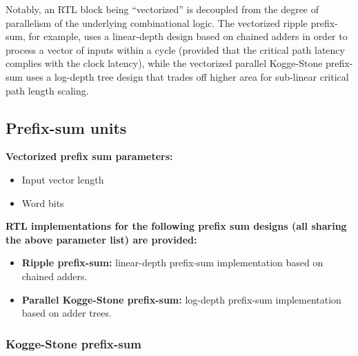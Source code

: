 Notably, an RTL block being ``vectorized'' is decoupled from the degree of parallelism of the underlying combinational logic. The vectorized ripple prefix-sum, for example, uses a linear-depth design based on chained adders in order to process a vector of inputs within a cycle (provided that the critical path latency complies with the clock latency), while the vectorized parallel Kogge-Stone\cite{koggestone} prefix-sum uses a log-depth tree design that trades off higher area for sub-linear critical path length scaling.

\subsection{Prefix-sum units}

\textbf{Vectorized prefix sum parameters:}

\begin{itemize}
    \item Input vector length
    \item Word bits
\end{itemize}

\textbf{RTL implementations for the following prefix sum designs (all sharing the above parameter list) are provided:}

\begin{itemize}
    \item \textbf{Ripple prefix-sum:} linear-depth prefix-sum implementation based on chained adders.
    \item \textbf{Parallel Kogge-Stone\cite{koggestone} prefix-sum:} log-depth prefix-sum implementation based on adder trees.
\end{itemize}

\subsubsection{Kogge-Stone prefix-sum}

